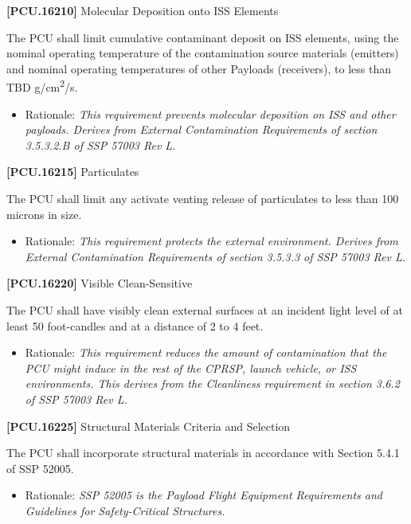 \documentclass[12pt,oneside,oldfontcommands]{memoir}
\begin{document}
\textbf{[PCU.16210]} Molecular Deposition onto \gls{ISS} Elements

The \gls{PCU} shall limit cumulative contaminant deposit on \gls{ISS} elements, using the nominal operating temperature of the contamination source materials (emitters) and nominal operating temperatures of other Payloads (receivers), to less than TBD\label{tbx_10} g\slash cm\textsuperscript{2}\slash s.

\begin{itemize}
\item{} Rationale: \emph{This requirement prevents molecular deposition on ISS and other payloads. Derives from External Contamination Requirements of section 3.5.3.2.B of SSP 57003 Rev L.}

\end{itemize}

\textbf{[PCU.16215]} Particulates

The \gls{PCU} shall limit any activate venting release of particulates to less than 100 microns in size.

\begin{itemize}
\item{} Rationale: \emph{This requirement protects the external environment. Derives from External Contamination Requirements of section 3.5.3.3 of SSP 57003 Rev L.}

\end{itemize}

\textbf{[PCU.16220]} Visible Clean-Sensitive

The \gls{PCU} shall have visibly clean external surfaces at an incident light level of at least 50 foot-candles and at a distance of 2 to 4 feet.

\begin{itemize}
\item{} Rationale: \emph{This requirement reduces the amount of contamination that the PCU might induce in the rest of the CPRSP, launch vehicle, or ISS environments. This derives from the Cleanliness requirement in section 3.6.2 of SSP 57003 Rev L.}

\end{itemize}

\textbf{[PCU.16225]} Structural Materials Criteria and Selection

The \gls{PCU} shall incorporate structural materials in accordance with Section 5.4.1 of SSP 52005.

\begin{itemize}
\item{} Rationale: \emph{SSP 52005 is the Payload Flight Equipment Requirements and Guidelines for Safety-Critical Structures.}

\end{itemize}
\end{document}
